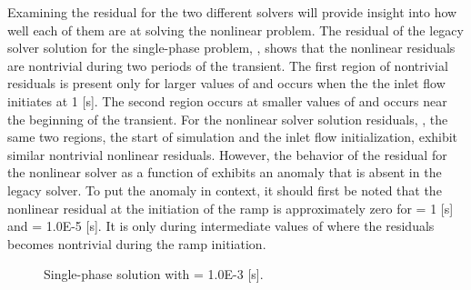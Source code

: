 Examining the residual for the two different solvers will provide insight into how well each of them are at solving the nonlinear problem.
The residual of the legacy solver solution for the single-phase problem, , shows that the nonlinear residuals are nontrivial during two periods of the transient.
The first region of nontrivial residuals is present only for larger values of \dtmax{} and occurs when the the inlet flow initiates at 1 [s].
The second region occurs at smaller values of \dtmax{} and occurs near the beginning of the transient.
For the nonlinear solver solution residuals, , the same two regions, the start of simulation and the inlet flow initialization, exhibit similar nontrivial nonlinear residuals.
However, the behavior of the residual for the nonlinear solver as a function of \dtmax{} exhibits an anomaly that is absent in the legacy solver.
To put the anomaly in context, it should first be noted that the nonlinear residual at the initiation of the ramp is approximately zero for \dtmax{} = 1 [s] and \dtmax{} = 1.0E-5 [s].
It is only during intermediate values of \dtmax{} where the residuals becomes nontrivial during the ramp initiation.

\begin{figure}[h!t]
\centering
{}
\caption[Single-phase solution at \dtmax{} = 1.0E-3 {[s]}]{Single-phase solution with \dtmax{} = 1.0E-3 {[s]}.}
\label{fig:single_compare_3}
\end{figure}

